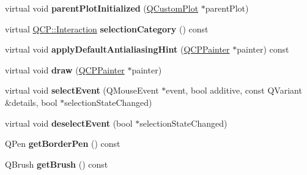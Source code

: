 \begin{DoxyCompactItemize}
\item 
\mbox{\label{class_q_c_p_legend_a4d552c63d82742d77fb7f177bae7b1ba}} 
virtual void {\bfseries parent\+Plot\+Initialized} (\hyperlink{class_q_custom_plot}{Q\+Custom\+Plot} $\ast$parent\+Plot)
\item 
\mbox{\label{class_q_c_p_legend_a8e11032dd41db9e53fd3ab0c3c813202}} 
virtual \hyperlink{namespace_q_c_p_a2ad6bb6281c7c2d593d4277b44c2b037}{Q\+C\+P\+::\+Interaction} {\bfseries selection\+Category} () const
\item 
\mbox{\label{class_q_c_p_legend_a1aea4fc7cdde130a58d0d225440cdbbb}} 
virtual void {\bfseries apply\+Default\+Antialiasing\+Hint} (\hyperlink{class_q_c_p_painter}{Q\+C\+P\+Painter} $\ast$painter) const
\item 
\mbox{\label{class_q_c_p_legend_a4462151bf875ca85fa3815457c683fdc}} 
virtual void {\bfseries draw} (\hyperlink{class_q_c_p_painter}{Q\+C\+P\+Painter} $\ast$painter)
\item 
\mbox{\label{class_q_c_p_legend_af93bf87dc5c383a9d2ada80b35f3a1a5}} 
virtual void {\bfseries select\+Event} (Q\+Mouse\+Event $\ast$event, bool additive, const Q\+Variant \&details, bool $\ast$selection\+State\+Changed)
\item 
\mbox{\label{class_q_c_p_legend_a5208ead4331c9b0440f768f059777c58}} 
virtual void {\bfseries deselect\+Event} (bool $\ast$selection\+State\+Changed)
\item 
\mbox{\label{class_q_c_p_legend_a1cf9df6f2130c5ad842dc92188ab6bd7}} 
Q\+Pen {\bfseries get\+Border\+Pen} () const
\item 
\mbox{\label{class_q_c_p_legend_ab1438d5d67304cdda3b9339da580d6bc}} 
Q\+Brush {\bfseries get\+Brush} () const
\end{DoxyCompactItemize}
